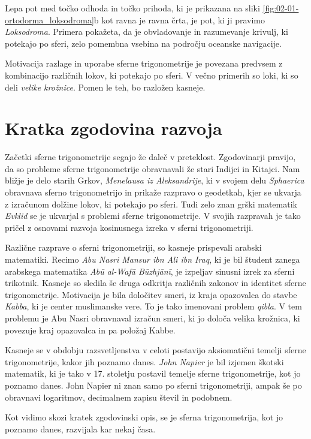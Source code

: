 Lepa pot med točko odhoda in točko prihoda, ki je prikazana na sliki \ref{fig:02-01-ortodorma_loksodroma}b kot ravna je ravna črta, je pot, ki ji pravimo \emph{Loksodroma}. Primera pokažeta, da je obvladovanje in razumevanje krivulj, ki potekajo po sferi, zelo pomembna vsebina na področju oceanske navigacije. 

Motivacija razlage in uporabe sferne trigonometrije je povezana predvsem z kombinacijo različnih lokov, ki potekajo po sferi. V večno primerih so loki, ki so deli \emph{velike krožnice}. Pomen le teh, bo razložen kasneje. 


\section{Kratka zgodovina razvoja}

Začetki sferne trigonometrije segajo že daleč v preteklost. Zgodovinarji pravijo, da so probleme sferne trigonometrije obravnavali že stari Indijci in Kitajci. Nam bližje je delo starih Grkov, \textit{Menelausa iz Aleksandrije}, ki v svojem delu \textit{Sphaerica} obravnava sferno trigonometrijo in prikaže razpravo o geodetkah, kjer se ukvarja z izračunom dolžine lokov, ki potekajo po sferi. Tudi zelo znan grški matematik \textit{Evklid} se je ukvarjal s problemi sferne trigonometrije. V svojih razpravah je tako pričel z osnovami razvoja kosinusnega izreka v sferni trigonometriji.

Različne razprave o sferni trigonometriji, so kasneje prispevali arabski matematiki. Recimo \textit{Abu Nasri Mansur ibn Ali ibn Iraq}, ki je bil študent zanega arabskega matematika \textit{Abū al-Wafā Būzhjānī}, je izpeljav sinusni izrek za sferni trikotnik. Kasneje so sledila še druga odkritja različnih zakonov in identitet sferne trigonometrije. Motivacija je bila določitev smeri, iz kraja opazovalca do stavbe \textit{Kabba}, ki je center muslimanske vere. To je tako imenovani problem \textit{qibla}. V tem problemu je Abu Nasri obravnaval izračun smeri, ki jo določa velika krožnica, ki povezuje kraj opazovalca in pa položaj Kabbe.

Kasneje se v obdobju razsvetljenstva v celoti postavijo aksiomatični temelji sferne trigonometrije, kakor jih poznamo danes. \emph{John Napier} je bil izjemen škotski matematik, ki je tako v 17. stoletju postavil temelje sferne trigonometrije, kot jo poznamo danes. John Napier ni znan samo po sferni trigonometriji, ampak še po obravnavi logaritmov, decimalnem zapisu števil in podobnem.

Kot vidimo skozi kratek zgodovinski opis, se je sferna trigonometrija, kot jo poznamo danes, razvijala kar nekaj časa.



